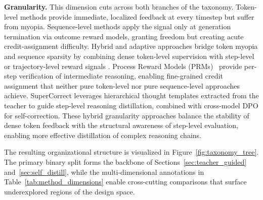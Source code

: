 \documentclass{article} %
\begin{document}
\textbf{Granularity.} This dimension cuts across both branches of the taxonomy. Token-level methods provide immediate, localized feedback at every timestep but suffer from myopia. Sequence-level methods apply the signal only at generation termination via outcome reward models, granting freedom but creating acute credit-assignment difficulty. Hybrid and adaptive approaches bridge token myopia and sequence sparsity by combining dense token-level supervision with step-level or trajectory-level reward signals \citep{2305.20050,2410.09008,2505.16142,2602.12674}. Process Reward Models (PRMs)~\citep{2305.20050} provide per-step verification of intermediate reasoning, enabling fine-grained credit assignment that neither pure token-level nor pure sequence-level approaches achieve. SuperCorrect \citep{2410.09008} leverages hierarchical thought templates extracted from the teacher to guide step-level reasoning distillation, combined with cross-model DPO for self-correction. These hybrid granularity approaches balance the stability of dense token feedback with the structural awareness of step-level evaluation, enabling more effective distillation of complex reasoning chains.

The resulting organizational structure is visualized in Figure~\ref{fig:taxonomy_tree}. The primary binary split forms the backbone of Sections~\ref{sec:teacher_guided} and~\ref{sec:self_distill}, while the multi-dimensional annotations in Table~\ref{tab:method_dimensions} enable cross-cutting comparisons that surface underexplored regions of the design space.
\end{document}
